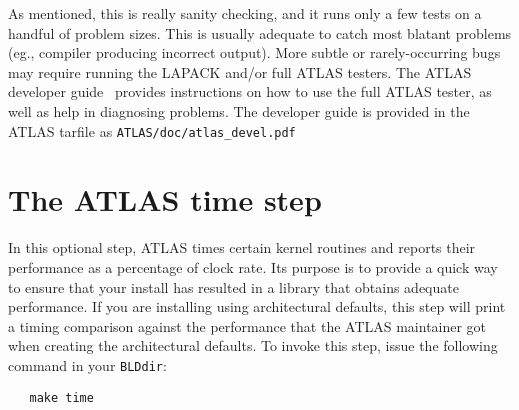 \documentclass[11pt]{article}
\begin{document}
As mentioned, this is really sanity checking, and it runs only a few tests
on a handful of problem sizes.  This is usually adequate to catch most
blatant problems (eg., compiler producing incorrect output).  More subtle
or rarely-occurring bugs may require running the LAPACK and/or full ATLAS
testers.  The ATLAS developer guide~\cite{atlas-devel} provides instructions
on how to use the full ATLAS tester, as well as help in diagnosing problems.
The developer guide is provided in the ATLAS tarfile as
{\tt ATLAS/doc/atlas\_devel.pdf}

\section{The ATLAS time step}
\label{sec-time}
In this optional step, ATLAS times certain kernel routines and reports their
performance as a percentage of clock rate.  Its purpose is to provide a
quick way to ensure that your install has resulted in a library that obtains
adequate performance.  If you are installing using architectural
defaults, this step will print a timing comparison against the performance
that the ATLAS maintainer got when creating the architectural defaults.
To invoke this step, issue the following command in your {\tt BLDdir}:
\vspace*{-0.1in}
\begin{verbatim}
   make time
\end{verbatim}
\end{document}
